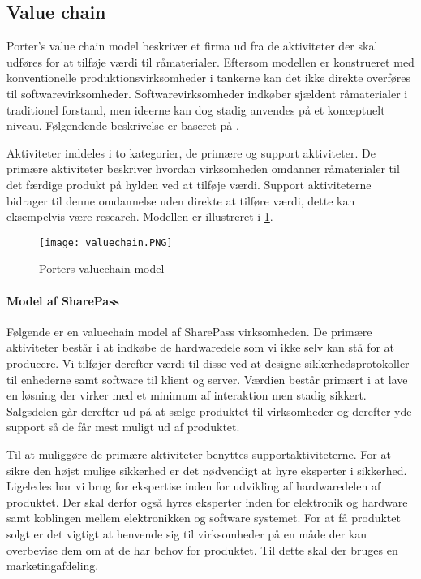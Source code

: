 \subsection{Value chain}\label{value_chain}


Porter's value chain model beskriver et firma ud fra de aktiviteter der skal udføres for at tilføje værdi til råmaterialer.
Eftersom modellen er konstrueret med konventionelle produktionsvirksomheder i tankerne kan det ikke direkte overføres til softwarevirksomheder.
Softwarevirksomheder indkøber sjældent råmaterialer i traditionel forstand, men ideerne kan dog stadig anvendes på et konceptuelt niveau.
Følgendende beskrivelse er baseret på \citet[p.~12]{rose2012software}.


Aktiviteter inddeles i to kategorier, de primære og support aktiviteter.
De primære aktiviteter beskriver hvordan virksomheden omdanner råmaterialer til det færdige produkt på hylden ved at tilføje værdi.
Support aktiviteterne bidrager til denne omdannelse uden direkte at tilføre værdi, dette kan eksempelvis være research.
Modellen er illustreret i  \cref{valuechain}.

\begin{figure}[H]
	\texttt{[image: valuechain.PNG]}
	\caption{Porters valuechain model}
	\label{valuechain}
\end{figure}

\paragraph{Model af SharePass}
Følgende er en valuechain model af SharePass virksomheden.
De primære aktiviteter består i at indkøbe de hardwaredele som vi ikke selv kan stå for at producere.
Vi tilføjer derefter værdi til disse ved at designe sikkerhedsprotokoller til enhederne samt software til klient og server.
Værdien består primært i at lave en løsning der virker med et minimum af interaktion men stadig sikkert.
Salgsdelen går derefter ud på at sælge produktet til virksomheder og derefter yde support så de får mest muligt ud af produktet.

Til at muliggøre de primære aktiviteter benyttes supportaktiviteterne.
For at sikre den højst mulige sikkerhed er det nødvendigt at hyre eksperter i sikkerhed.
Ligeledes har vi brug for ekspertise inden for udvikling af hardwaredelen af produktet.
Der skal derfor også hyres eksperter inden for elektronik og hardware samt koblingen mellem elektronikken og software systemet.
For at få produktet solgt er det vigtigt at henvende sig til virksomheder på en måde der kan overbevise dem om at de har behov for produktet.
Til dette skal der bruges en marketingafdeling.

